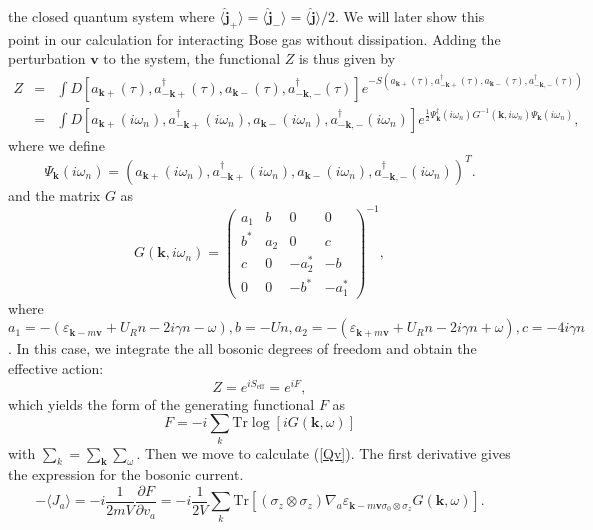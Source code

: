 \documentclass[aps,superscriptaddress,notitlepage,longbibliography]{revtex4-1}
\begin{document}
the closed quantum system where $\langle\hat{\bm{j}}_{+}\rangle=\langle\hat{\bm{j}}_{-}\rangle=\langle\hat{\bm{j}}\rangle/2$.
We will later show this point in our calculation for interacting Bose
gas without dissipation. Adding the perturbation $\bm{v}$ to the
system, the functional $Z$ is thus given by 
\begin{eqnarray}
Z & = & \int D[a_{\bm{k}+}(\tau),a_{-\bm{k}+}^{\dagger}(\tau),a_{\bm{k}-}(\tau),a_{-\bm{k},-}^{\dagger}(\tau)]e^{-S(a_{\bm{k}+}(\tau),a_{-\bm{k}+}^{\dagger}(\tau),a_{\bm{k}-}(\tau),a_{-\bm{k},-}^{\dagger}(\tau))}\nonumber \\
 & = & \int D[a_{\bm{k}+}(i\omega_{n}),a_{-\bm{k}+}^{\dagger}(i\omega_{n}),a_{\bm{k}-}(i\omega_{n}),a_{-\bm{k},-}^{\dagger}(i\omega_{n})]e^{\frac{1}{2}\Psi_{\bm{k}}^{\dagger}(i\omega_{n})G^{-1}(\bm{k},i\omega_{n})\Psi_{\bm{k}}(i\omega_{n})},
\end{eqnarray}
where we define 
\begin{equation}
\Psi_{\bm{k}}(i\omega_{n})=(a_{\bm{k}+}(i\omega_{n}),a_{-\bm{k}+}^{\dagger}(i\omega_{n}),a_{\bm{k}-}(i\omega_{n}),a_{-\bm{k},-}^{\dagger}(i\omega_{n}))^{T}.
\end{equation}
and the matrix $G$ as 
\begin{equation}
G(\bm{k},i\omega_{n})=\left(\begin{array}{cccc}
a_{1} & b & 0 & 0\\
b^{\ast} & a_{2} & 0 & c\\
c & 0 & -a_{2}^{\ast} & -b\\
0 & 0 & -b^{\ast} & -a_{1}^{\ast}
\end{array}\right)^{-1},\label{Green2}
\end{equation}
where $a_{1}=-(\varepsilon_{\bm{k}-m\bm{v}}+U_{R}n-2i\gamma n-\omega),b=-Un,a_{2}=-(\varepsilon_{\bm{k}+m\bm{v}}+U_{R}n-2i\gamma n+\omega),c=-4i\gamma n$.
In this case, we integrate the all bosonic degrees of freedom and
obtain the effective action: 
\begin{equation}
Z=e^{iS_{\text{eff}}}=e^{iF},
\end{equation}
which yields the form of the generating functional $F$ as 
\begin{equation}
F=-i\sum_{k}\text{Tr}\log[iG(\bm{k},\omega)]
\end{equation}
with $\sum_{k}=\sum_{\bm{k}}\sum_{\omega}$. Then we move to calculate
(\ref{Qv}). The first derivative gives the expression for the bosonic
current. 
\begin{equation}
-\langle J_{a}\rangle=-i\frac{1}{2mV}\frac{\partial F}{\partial v_{a}}=-i\frac{1}{2V}\sum_{k}\text{Tr}[(\sigma_{z}\otimes\sigma_{z})\nabla_{a}\varepsilon_{\bm{k}-m\bm{v}\sigma_{0}\otimes\sigma_{z}}G(\bm{k},\omega)].
\end{equation}
\end{document}
